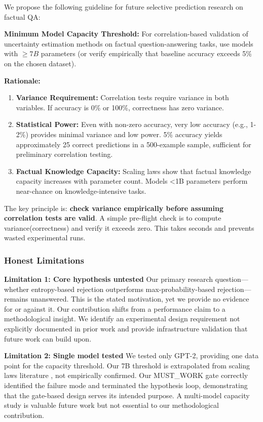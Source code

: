 We propose the following guideline for future selective prediction research on factual QA:

\textbf{Minimum Model Capacity Threshold:} For correlation-based validation of uncertainty estimation methods on factual question-answering tasks, use models with $\geq 7B$ parameters (or verify empirically that baseline accuracy exceeds 5\% on the chosen dataset).

\textbf{Rationale:}
\begin{enumerate}
\item \textbf{Variance Requirement:} Correlation tests require variance in both variables. If accuracy is 0\% or 100\%, correctness has zero variance.
\item \textbf{Statistical Power:} Even with non-zero accuracy, very low accuracy (e.g., 1-2\%) provides minimal variance and low power. 5\% accuracy yields approximately 25 correct predictions in a 500-example sample, sufficient for preliminary correlation testing.
\item \textbf{Factual Knowledge Capacity:} Scaling laws show that factual knowledge capacity increases with parameter count. Models <1B parameters perform near-chance on knowledge-intensive tasks.
\end{enumerate}

The key principle is: \textbf{check variance empirically before assuming correlation tests are valid}. A simple pre-flight check is to compute variance(correctness) and verify it exceeds zero. This takes seconds and prevents wasted experimental runs.

\subsubsection{Honest Limitations}

\textbf{Limitation 1: Core hypothesis untested}  
Our primary research question---whether entropy-based rejection outperforms max-probability-based rejection---remains unanswered. This is the stated motivation, yet we provide no evidence for or against it. Our contribution shifts from a performance claim to a methodological insight. We identify an experimental design requirement not explicitly documented in prior work and provide infrastructure validation that future work can build upon.

\textbf{Limitation 2: Single model tested}  
We tested only GPT-2, providing one data point for the capacity threshold. Our 7B threshold is extrapolated from scaling laws literature \citep{Roberts2020}, not empirically confirmed. Our MUST\_WORK gate correctly identified the failure mode and terminated the hypothesis loop, demonstrating that the gate-based design serves its intended purpose. A multi-model capacity study is valuable future work but not essential to our methodological contribution.

